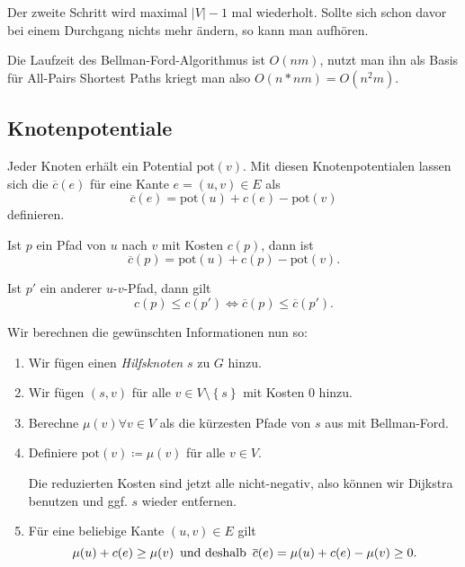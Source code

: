 Der zweite Schritt wird maximal \( \left\vert V \right\vert - 1 \) mal wiederholt. Sollte sich schon davor bei einem Durchgang nichts mehr ändern, so kann man aufhören.

Die Laufzeit des Bellman-Ford-Algorithmus ist \( O(nm) \), nutzt man ihn als Basis für All-Pairs Shortest Paths kriegt man also \( O(n * nm) = O(n^2m) \).

\subsection{Knotenpotentiale}

Jeder Knoten erhält ein Potential \( \text{pot}(v) \). Mit diesen Knotenpotentialen lassen sich die  \( \overline{c}(e) \) für eine Kante \( e = (u,v) \in E \) als
\begin{equation*}
  \overline{c}(e) = \text{pot}(u) + c(e) - \text{pot}(v)
\end{equation*}
definieren.

Ist \( p \) ein Pfad von \( u \) nach \( v \) mit Kosten \( c(p) \), dann ist
\begin{equation*}
  \overline{c}(p) = \text{pot}(u) + c(p) - \text{pot}(v)\text{.}
\end{equation*}

Ist \( p' \) ein anderer \( u \)-\( v \)-Pfad, dann gilt
\begin{equation*}
  c(p) \leq c(p') \Leftrightarrow \overline{c}(p) \leq \overline{c}(p')\text{.}
\end{equation*}

Wir berechnen die gewünschten Informationen nun so:
\begin{enumerate}
  \item Wir fügen einen \emph{Hilfsknoten} \( s \) zu \( G \) hinzu.
  \item Wir fügen \( (s,v) \) für alle \( v \in V \setminus \left \{ s \right \} \) mit Kosten \( 0 \) hinzu.
  \item Berechne $\mu (v) \forall v \in V$ als die kürzesten Pfade von \( s \) aus mit Bellman-Ford.
  \item Definiere \( \text{pot}(v) \coloneqq \mu(v) \) für alle \( v \in V \).

  Die reduzierten Kosten sind jetzt alle nicht-negativ, also können wir Dijkstra benutzen und ggf. \( s \) wieder entfernen.
  \item Für eine beliebige Kante \( (u,v) \in E \) gilt
  \begin{equation*}
    \mu(u) + c(e) \geq \mu(v) \enskip \text{und deshalb} \enskip \overline{c}(e) = \mu(u) + c(e) - \mu(v) \geq 0\text{.}
  \end{equation*}
\end{enumerate}

